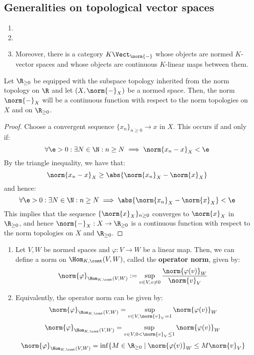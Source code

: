     \subsection{Generalities on topological vector spaces}
        \begin{definition} \label{def: normed_spaces}
            \begin{enumerate}
                \item 
                \item 
                \item Moreover, there is a category $K\-\Vect_{\norm{-}}$ whose objects are normed $K$-vector spaces and whose objects are continuous $K$-linear maps between them. 
            \end{enumerate}
        \end{definition}
        \begin{lemma} \label{lemma: norms_are_continuous}
            Let $\R_{\geq 0}$ be equipped with the subspace topology inherited from the norm topology on $\R$ and let $(X, \norm{-}_X)$ be a normed space. Then, the norm $\norm{-}_X$ will be a continuous function with respect to the norm topologies on $X$ and on $\R_{\geq 0}$.
        \end{lemma}
            \begin{proof}
                Choose a convergent sequence $\{x_n\}_{n \geq 0} \to x$ in $X$. This occurs if and only if:
                    $$\forall \e > 0: \exists N \in \N: n \geq N \implies \norm{x_n - x}_X < \e$$
                By the triangle inequality, we have that:
                    $$\norm{x_n - x}_X \geq \abs{ \norm{x_n}_X - \norm{x}_X }$$
                and hence:
                    $$\forall \e > 0: \exists N \in \N: n \geq N \implies \abs{ \norm{x_n}_X - \norm{x}_X } < \e$$
                This implies that the sequence $\{ \norm{x}_X \}_{n \geq 0}$ converges to $\norm{x}_X$ in $\R_{\geq 0}$, and hence $\norm{-}_X: X \to \R_{\geq 0}$ is a continuous function with respect to the norm topologies on $X$ and $\R_{\geq 0}$.
            \end{proof}
        \begin{proposition} \label{prop: operator_norm}
            \begin{enumerate}
                \item Let $V, W$ be normed spaces and $\varphi: V \to W$ be a linear map. Then, we can define a norm on $\Hom_{K, \cont}(V, W)$, called the \textbf{operator norm}, given by:
                    $$\norm{\varphi}_{\Hom_{K, \cont}(V, W)} := \sup_{v \in V, v \not = 0} \frac{ \norm{\varphi(v)}_W }{ \norm{v}_V }$$
                \item Equivalently, the operator norm can be given by:
                    $$\norm{\varphi}_{\Hom_{K, \cont}(V, W)} = \sup_{v \in V, \norm{v}_V = 1} \norm{\varphi(v)}_W$$
                    $$\norm{\varphi}_{\Hom_{K, \cont}(V, W)} = \sup_{v \in V, 0 < \norm{v}_V \leq 1} \norm{\varphi(v)}_W$$
                    $$\norm{\varphi}_{\Hom_{K, \cont}(V, W)} = \inf\{ M \in \R_{\geq 0} \mid \norm{\varphi(v)}_W \leq M \norm{v}_V \}$$
            \end{enumerate}
        \end{proposition}
